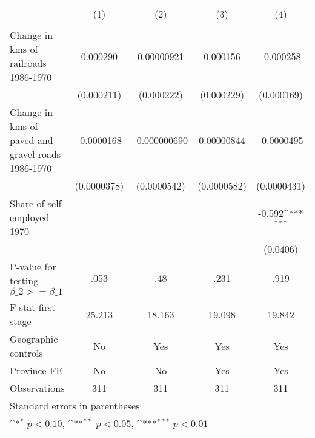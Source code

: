 {
\def\sym#1{\ifmmode^{#1}\else\(^{#1}\)\fi}
\begin{tabular}{l*{4}{c}}
\hline\hline
                &\multicolumn{1}{c}{(1)}&\multicolumn{1}{c}{(2)}&\multicolumn{1}{c}{(3)}&\multicolumn{1}{c}{(4)}\\
                &\multicolumn{1}{c}{}&\multicolumn{1}{c}{}&\multicolumn{1}{c}{}&\multicolumn{1}{c}{}\\
\hline
Change in kms of railroads 1986-1970& 0.000290         &0.00000921         & 0.000156         &-0.000258         \\
                &(0.000211)         &(0.000222)         &(0.000229)         &(0.000169)         \\
[1em]
Change in kms of paved and gravel roads 1986-1970&-0.0000168         &-0.000000690         &0.00000844         &-0.0000495         \\
                &(0.0000378)         &(0.0000542)         &(0.0000582)         &(0.0000431)         \\
[1em]
Share of self-employed 1970&                  &                  &                  &   -0.592\sym{***}\\
                &                  &                  &                  & (0.0406)         \\
\hline
P-value for testing $\beta\_{2} >= \beta\_{1}$&     .053         &      .48         &     .231         &     .919         \\
F-stat first stage&   25.213         &   18.163         &   19.098         &   19.842         \\
Geographic controls&       No         &      Yes         &      Yes         &      Yes         \\
Province FE     &       No         &       No         &      Yes         &      Yes         \\
Observations    &      311         &      311         &      311         &      311         \\
\hline\hline
\multicolumn{5}{l}{\footnotesize Standard errors in parentheses}\\
\multicolumn{5}{l}{\footnotesize \sym{*} \(p<0.10\), \sym{**} \(p<0.05\), \sym{***} \(p<0.01\)}\\
\end{tabular}
}
